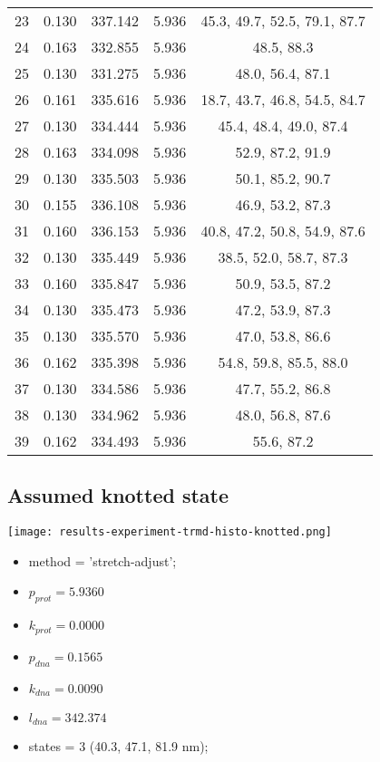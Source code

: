 \begin{table}
\begin{tabular}{c|c|c|c|c}
        23 & 0.130 & 337.142 & 5.936 & 45.3, 49.7, 52.5, 79.1, 87.7\\
        24 & 0.163 & 332.855 & 5.936 & 48.5, 88.3\\
        25 & 0.130 & 331.275 & 5.936 & 48.0, 56.4, 87.1\\
        26 & 0.161 & 335.616 & 5.936 & 18.7, 43.7, 46.8, 54.5, 84.7\\
        27 & 0.130 & 334.444 & 5.936 & 45.4, 48.4, 49.0, 87.4\\
        28 & 0.163 & 334.098 & 5.936 & 52.9, 87.2, 91.9\\
        29 & 0.130 & 335.503 & 5.936 & 50.1, 85.2, 90.7\\
        30 & 0.155 & 336.108 & 5.936 & 46.9, 53.2, 87.3\\
        31 & 0.160 & 336.153 & 5.936 & 40.8, 47.2, 50.8, 54.9, 87.6\\
        32 & 0.130 & 335.449 & 5.936 & 38.5, 52.0, 58.7, 87.3\\
        33 & 0.160 & 335.847 & 5.936 & 50.9, 53.5, 87.2\\
        34 & 0.130 & 335.473 & 5.936 & 47.2, 53.9, 87.3\\
        35 & 0.130 & 335.570 & 5.936 & 47.0, 53.8, 86.6\\
        36 & 0.162 & 335.398 & 5.936 & 54.8, 59.8, 85.5, 88.0\\
        37 & 0.130 & 334.586 & 5.936 & 47.7, 55.2, 86.8\\
        38 & 0.130 & 334.962 & 5.936 & 48.0, 56.8, 87.6\\
        39 & 0.162 & 334.493 & 5.936 & 55.6, 87.2\\
    \end{tabular}
\end{table}


\subsection{Assumed knotted state}
\label{subsec:fit-details-trmd-experiment-knotted}
\begin{minipage}[c]{0.7\textwidth}
    \texttt{[image: results-experiment-trmd-histo-knotted.png]}
\end{minipage}
\hfill
\begin{minipage}[c]{0.45\textwidth}
    \begin{itemize}
        \item method = 'stretch-adjust';
        \item $p_{prot}=5.9360$
        \item $k_{prot}=0.0000$
        \item $p_{dna}=0.1565$
        \item $k_{dna}=0.0090$
        \item $l_{dna}=342.374$
        \item states = 3 (40.3, 47.1, 81.9 nm);
    \end{itemize}
\end{minipage}

